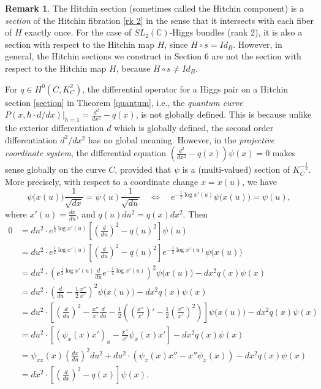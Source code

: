 \documentclass[oneside, 11pt]{amsart}
\theoremstyle{definition}
\newtheorem{rem}[thm]{Remark}
\numberwithin{equation}{subsection}
\newcommand{\bC}{{\mathbb{C}}}
\newcommand{\half}{{\frac{1}{2}}}
\begin{document}
\begin{rem}
The Hitchin section (sometimes called the Hitchin component) is a \emph{section} of the Hitchin fibration \ref{rk 2} in the
sense that it intersects with  each fiber of $H$ 
exactly once. 
For the case of $SL_2(\bC)$-Higgs bundles (rank 2),
it is also a section with respect to the Hitchin map $H$, since $H\circ s= Id_B$. However,
in general, the Hitchin sections we construct
in Section 6 are not the section with respect to
the Hitchin map $H$, because $H\circ s \ne Id_B$.
\end{rem}



For $q\in  H^0(C, K_C^2)$, the differential operator for a Higgs pair on a Hitchin section \eqref{section} in Theorem \ref{quantum}, i.e., the \textit{quantum curve}  $P(x,\hbar \cdot d/dx)|_{\hbar=1}=\frac{d^2}{dx^2}-q(x)$, is not globally defined. This is because
unlike the exterior differentiation $d$
which is globally defined,
the second order differentiation $d^2/dx^2$
has no global meaning. However, in the \textit{projective coordinate system}, the differential equation $\left(\frac{d^2}{dx^2}-q(x)\right)\psi(x)=0$ 
makes sense globally on the curve $C$,
provided that $\psi$ is a (multi-valued) section 
of $K_C^{-\half}$. 
More precisely, with respect to a coordinate change  $x=x(u)$, we have 
$$
\psi\big(x(u)\big) \frac{1}{\sqrt{dx}}
= \psi(u)\frac{1}{\sqrt{du}}
\quad
\Longleftrightarrow
\quad
e^{-\half \log x'(u)} \psi\big(x(u)\big)
= \psi(u),
$$
where $x'(u) = \frac{dx}{du}$, 
and $q(u)du^2 = q(x)dx^2$.
Then
\begin{align*}
0&=du^2 \cdot e^{\half \log x'(u)}\left[\left(
\frac{d}{du}\right)^2-q(u)^2\right]\psi(u)
\\
&=
du^2 \cdot e^{\half \log x'(u)}\left[\left(
\frac{d}{du}\right)^2-q(u)^2\right]
e^{-\half \log x'(u)}\psi\big(x(u)
\big)
\\
&=
du^2\cdot\left(e^{\half \log x'(u)}
\frac{d}{du}
e^{-\half \log x'(u)}\right)^2
\psi\big(x(u)\big)
-dx^2 q(x)\psi(x)
\\
&=
du^2\cdot \left(\frac{d}{du}-\half \frac{x''}{x'}
\right)^2 
\psi\big(x(u)\big)
-dx^2 q(x)\psi(x)
\\
&=
du^2\cdot \left[\left(\frac{d}{du}\right)^2-
 \frac{x''}{x'}\frac{d}{du}-\half
 \left(\left(\frac{x''}{x'}\right)'-
 \half \left(\frac{x''}{x'}\right)^2\right)\right]
\psi\big(x(u)\big)
-dx^2 q(x)\psi(x)
\\
&=
du^2\cdot \left[\left(\psi_x(x)x'\right)_u-\frac{x''}{x'}
\psi_x(x)x'\right]
-dx^2 q(x)\psi(x)
\\
&=
\psi_{xx}(x)\left(\frac{dx}{du}\right)^2du^2
+du^2\cdot \left(\psi_x(x)x''-x''\psi_x(x)\right)
-dx^2 q(x)\psi(x)
\\
&=dx^2\cdot \left[\left(\frac{d}{dx}\right)^2-q(x)
\right]\psi(x).
\end{align*}
\end{document}
